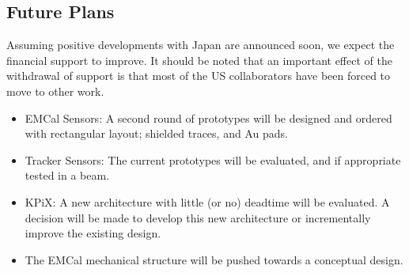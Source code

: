 \subsection{Future Plans}
Assuming positive developments with Japan are announced soon, we expect the financial support to improve. It should be noted that an important effect of the withdrawal of support is that most of the US collaborators have been forced to move to other work.
\begin{itemize}
	\item EMCal Sensors: A second round of prototypes will be designed and ordered with rectangular layout; shielded traces, and Au pads.
	\item Tracker Sensors: The current prototypes will be evaluated, and if appropriate tested in a beam.
	\item KPiX: A new architecture with little (or no) deadtime will be evaluated. A decision will be made to develop this new architecture or incrementally improve the existing design.
	\item The EMCal mechanical structure will be pushed towards a conceptual design.
\end{itemize}

